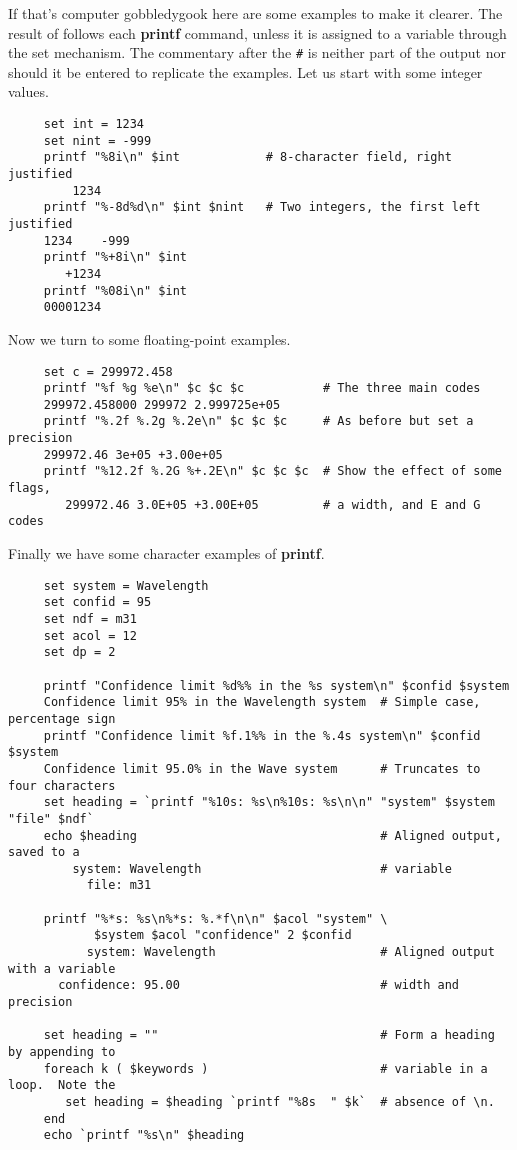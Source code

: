 \documentclass[twoside,11pt]{article}
\begin{document}
If that's computer gobbledygook here are some examples to make it
clearer.  The result of follows each {\bf printf} command, unless it
is assigned to a variable through the set mechanism.  The commentary
after the {\tt \#} is neither part of the output nor should it be
entered to replicate the examples.  Let us start with some integer values.
\small
\begin{verbatim}
     set int = 1234
     set nint = -999
     printf "%8i\n" $int            # 8-character field, right justified
         1234
     printf "%-8d%d\n" $int $nint   # Two integers, the first left justified
     1234    -999
     printf "%+8i\n" $int
        +1234
     printf "%08i\n" $int
     00001234
\end{verbatim}
\normalsize
Now we turn to some floating-point examples.
\small
\begin{verbatim}
     set c = 299972.458
     printf "%f %g %e\n" $c $c $c           # The three main codes
     299972.458000 299972 2.999725e+05
     printf "%.2f %.2g %.2e\n" $c $c $c     # As before but set a precision
     299972.46 3e+05 +3.00e+05
     printf "%12.2f %.2G %+.2E\n" $c $c $c  # Show the effect of some flags,
        299972.46 3.0E+05 +3.00E+05         # a width, and E and G codes
\end{verbatim}
\normalsize
Finally we have some character examples of {\bf printf}.
\small
\begin{verbatim}
     set system = Wavelength   
     set confid = 95
     set ndf = m31
     set acol = 12
     set dp = 2
     
     printf "Confidence limit %d%% in the %s system\n" $confid $system
     Confidence limit 95% in the Wavelength system  # Simple case, percentage sign
     printf "Confidence limit %f.1%% in the %.4s system\n" $confid $system
     Confidence limit 95.0% in the Wave system      # Truncates to four characters
     set heading = `printf "%10s: %s\n%10s: %s\n\n" "system" $system "file" $ndf`
     echo $heading                                  # Aligned output, saved to a 
         system: Wavelength                         # variable
           file: m31

     printf "%*s: %s\n%*s: %.*f\n\n" $acol "system" \
            $system $acol "confidence" 2 $confid
           system: Wavelength                       # Aligned output with a variable
       confidence: 95.00                            # width and precision

     set heading = ""                               # Form a heading by appending to
     foreach k ( $keywords )                        # variable in a loop.  Note the 
        set heading = $heading `printf "%8s  " $k`  # absence of \n.
     end
     echo `printf "%s\n" $heading
   \end{verbatim}
\normalsize
\end{document}
